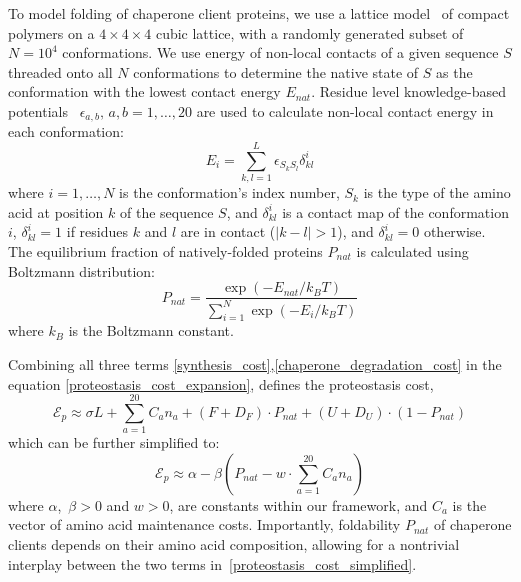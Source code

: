 \documentclass[10pt,letterpaper]{article}
\begin{document}
To model folding of chaperone client proteins, we use a lattice model~\cite{Shakhnovich1990Enumeration,Sikosek2014Biophysics} of compact polymers on a $4\times4\times4$ cubic lattice, with a randomly generated subset of $N=10^{4}$ conformations. We use energy of non-local contacts of a given sequence $S$ threaded onto all $N$ conformations to determine the native state of $S$ as the conformation with the lowest contact energy $E_{nat}$. Residue level knowledge-based potentials~\cite{Miyazawa1999SelfConsistent} $\epsilon_{a,b},\, a,b=1,\dots,20$ are used to calculate non-local contact energy in each conformation:
\begin{equation}
	\label{protein_globule_energy}
	E_{i} = \sum\limits_{k,l=1}^{L}\epsilon_{S_{k}S_{l}}\delta^{i}_{kl}
\end{equation}
where $i=1,\dots,N$ is the conformation's index number, $S_{k}$ is the type of the amino acid at position $k$ of the sequence $S$, and $\delta^{i}_{kl}$ is a contact map of the conformation $i$,  $\delta^{i}_{kl}=1$ if residues $k$ and $l$ are in contact ($|k-l|>1$), and $\delta^{i}_{kl}=0$ otherwise. The equilibrium fraction of natively-folded proteins $P_{nat}$ is calculated using Boltzmann distribution:
\begin{equation}
	\label{pnat_boltzmann}
	P_{nat} = \frac{\exp\left(-E_{nat}/k_{B}T\right)}{\sum\limits_{i=1}^{N}\exp\left(-E_{i}/k_{B}T\right)}
\end{equation}
where $k_{B}$ is the Boltzmann constant. 


Combining all three terms \eqref{synthesis_cost},\eqref{chaperone_degradation_cost} in the equation \eqref{proteostasis_cost_expansion}, defines the proteostasis cost, 
\begin{equation}
	\label{proteostasis_cost_detailed}
	\mathcal{E}_{p} \approx \sigma L + \sum\limits_{a=1}^{20}C_{a}n_{a} + (F+D_{F})\cdot P_{nat} + (U+D_{U})\cdot\left(1-P_{nat}\right)
\end{equation}
which can be further simplified to:
\begin{equation}
	\label{proteostasis_cost_simplified}
	\mathcal{E}_{p} \approx \alpha - \beta\left(P_{nat} - w\cdot\sum\limits_{a=1}^{20}C_{a}n_{a} \right)
\end{equation}
where $\alpha$,\, $\beta > 0$ and $w>0$, are constants within our framework, and $C_{a}$ is the vector of amino acid maintenance costs. Importantly, foldability $P_{nat}$ of chaperone clients depends on their amino acid composition, allowing for a nontrivial interplay between the two terms in~\eqref{proteostasis_cost_simplified}.
\end{document}
